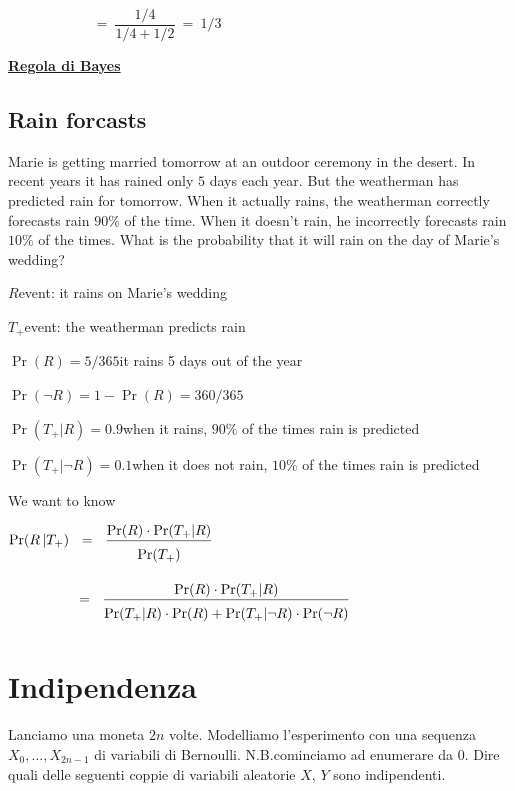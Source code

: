 \documentclass[12pt,openany]{book}
\theoremstyle{mio}
\theoremstyle{liscio}
\begin{document}
$\phantom{\Pr(C|S_{na})}\ =\ \dfrac{1/4}{1/4+1/2}\ =\ 1/3$


\hfill{}\clearpage\hfill
\textbf{{\color{brown}\hyperref[RegolaBayes]{Regola di Bayes} \faShare}}
\subsection{Rain forcasts}
\label{rain_desert}

Marie is getting married tomorrow at an outdoor ceremony in the desert. In recent years it has rained only $5$ days each year. But the weatherman has predicted rain for tomorrow. When it actually rains, the weatherman correctly forecasts rain $90\%$ of the time. When it doesn’t rain, he incorrectly forecasts rain $10\%$ of the times. What is the probability that it will rain on the day of Marie’s wedding?


$R$\hfill event: it rains on Marie’s wedding

$T_+$\hfill event: the weatherman predicts rain

$\Pr(R) = 5/365$\hfill it rains 5 days out of the year

$\Pr(\neg R) = 1-\Pr(R)= 360/365$

$\Pr(T_+|R) = 0.9$\hfill when it rains, $90\%$ of the times rain is predicted

$\Pr(T_+|\neg R) = 0.1$\hfill when it does not rain, $10\%$ of the times rain is predicted

\bigskip
We want to know

$\displaystyle \Pr(R\,| T_+)\medrel{=}\frac{\Pr(R)\cdot \Pr(T_+|R)}{\Pr(T_+)\vphantom{\Big[}}$

$\displaystyle\hphantom{\Pr(R | T_+)}\medrel{=}\frac{\Pr(R)\cdot \Pr(T_+|R)}{\Pr(T_+|R)\cdot \Pr(R)+ \Pr(T_+|\neg R)\cdot \Pr(\neg R)\vphantom{\Big[}}$


\hfill{}\clearpage\section{Indipendenza}
\label{esercizio_indipendenza}

Lanciamo una moneta $2n$ volte. Modelliamo l'esperimento con una sequenza $X_0,\dots,X_{2n-1}$ di variabili di Bernoulli. N.B.\@ cominciamo ad enumerare da $0$. Dire quali delle seguenti coppie di variabili aleatorie $X$, $Y$ sono indipendenti.\medskip
\end{document}
